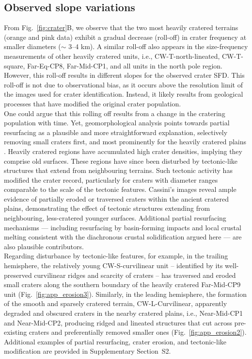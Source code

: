 \documentclass[preprint,11pt,3p,times,authoryear]{elsarticle}
\begin{document}
\subsection{Observed slope variations}
\label{subsec:rolloff}
From Fig.~\ref{fig:crater}B, we observe that the two most heavily cratered terrains (orange and pink data) exhibit a gradual decrease (roll-off) in crater frequency at smaller diameters ($\sim$ 3--4 km). A similar roll-off also appears in the size-frequency measurements of other heavily cratered units, i.e., CW-T-north-lineated, CW-T-square, Far-Eq-CP8, Far-Mid-CP1, and all units in the north pole region. However, this roll-off results in different slopes for the observed crater SFD. This roll-off is not due to observational bias, as it occurs above the resolution limit of the images used for crater identification. Instead, it likely results from geological processes that have modified the original crater population.\\

One could argue that this rolling off results from a change in the cratering population with time. Yet, geomorphological analysis points towards partial resurfacing as a plausible and more straightforward explanation, selectively removing small craters first, and most prominently for the heavily cratered plains \citep{Michael2010}. Heavily cratered regions have accumulated high crater densities, implying they comprise old surfaces. These regions have since been disturbed by tectonic-like structures that extend from neighbouring terrains. Such tectonic activity has modified the crater record, particularly for craters with diameter ranges comparable to the scale of the tectonic features. Cassini's images reveal ample evidence of partially eroded or traversed craters within the ancient cratered plains, demonstrating the effect of tectonic structures extending from neighbouring, less-cratered younger surfaces. Additional partial resurfacing mechanisms — including resurfacing by basin-forming impacts and local crustal melting consistent with the diachronous crustal solidification argued here — are also plausible contributors.\\


Regarding disturbance by tectonic-like features, for example, in the trailing hemisphere, the relatively young CW-S-curvilinear unit -- identified by its well-preserved curvilinear ridges and scarcity of craters -- has traversed and eroded small craters along the southern boundary of the heavily cratered Far-Mid-CP9 unit (Fig.~\ref{fig:app_erosion3}). Similarly, in the leading hemisphere, the formation of the smooth and sparsely cratered terrain, CW-L-Curvilinear, apparently degraded and obscured craters in the nearby cratered plains, i.e., Near-Mid-CP1 and Near-Mid-CP2, producing ridged and lineated structures that cut across pre-existing craters and preferentially removed smaller ones (Fig.~\ref{fig:app_erosion2}). Additional examples of partial resurfacing, crater erosion, and tectonic-like modification are provided in Supplementary Section~S2.\\
\end{document}
